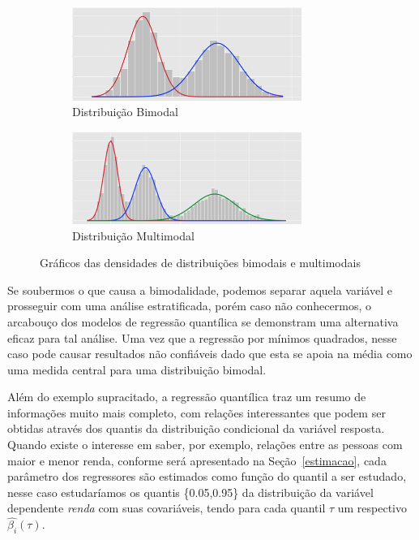 \documentclass[paper=a4, fontsize=11pt]{scrartcl}
\numberwithin{equation}{section}		%
\numberwithin{figure}{section}			%
\numberwithin{table}{section}				%
\begin{document}
\begin{figure}[H]
\begin{subfigure}{.5\textwidth}
  \centering
  \includegraphics[width=75mm]{Figuras/bimodal.png}
  \caption{Distribuição Bimodal}
  \label{fig:bimodal}
\end{subfigure}%
\begin{subfigure}{.5\textwidth}
  \centering
  \includegraphics[width=75mm]{Figuras/multimodal.png}
  \caption{Distribuição Multimodal}
  \label{fig:multimodal}
\end{subfigure}
\caption{Gráficos das densidades de distribuições bimodais e multimodais}
\label{fig:densidades}
\end{figure}

Se soubermos o que causa a bimodalidade, podemos separar aquela variável e prosseguir com uma análise estratificada, porém caso não conhecermos, o arcabouço dos modelos de regressão quantílica se demonstram uma alternativa eficaz para tal análise. Uma vez que a regressão por mínimos quadrados, nesse caso pode causar resultados não confiáveis dado que esta se apoia na média como uma medida central para uma distribuição bimodal.

Além do exemplo supracitado, a regressão quantílica traz um  resumo de informações muito mais completo, com relações interessantes que podem ser obtidas através dos quantis da distribuição condicional da variável resposta. Quando existe o interesse em saber, por exemplo, relações entre as pessoas com maior e menor renda, conforme será apresentado na Seção~\ref{estimacao}, cada parâmetro dos regressores são estimados como função do quantil a ser estudado, nesse caso estudaríamos os quantis \{0.05,0.95\} da distribuição da variável dependente \emph{renda} com suas covariáveis, tendo para cada quantil $\tau$ um respectivo $\hat{\beta_{i}}(\tau)$.
\end{document}

